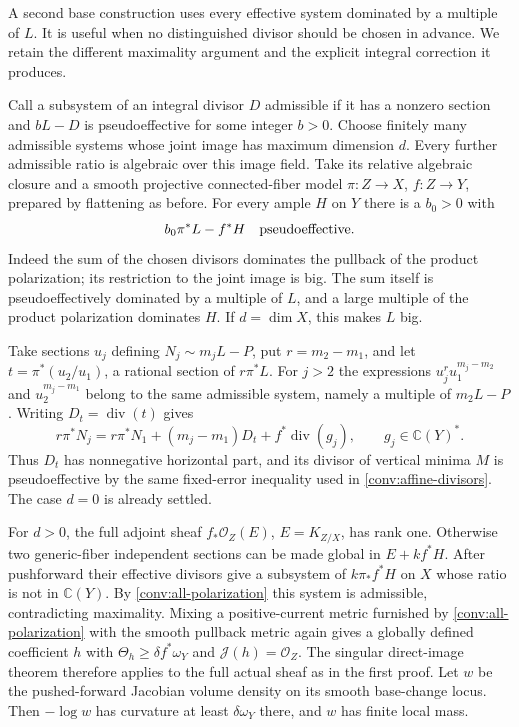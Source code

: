 A second base construction uses every effective system dominated by a
multiple of $L$.  It is useful when no distinguished divisor should be
chosen in advance.  We retain the different maximality argument and the
explicit integral correction it produces.

Call a subsystem of an integral divisor $D$ admissible if it has a
nonzero section and $bL-D$ is pseudoeffective for some integer $b>0$.
Choose finitely many admissible systems whose joint image has maximum
dimension $d$.  Every further admissible ratio is algebraic over this
image field.  Take its relative algebraic closure and a smooth
projective connected-fiber model $\pi:Z\to X$, $f:Z\to Y$, prepared
by flattening as before.  For every ample $H$ on $Y$ there is a $b_0>0$
with
\begin{equation}\label{conv:all-polarization}
 b_0\pi^*L-f^*H\quad\hbox{pseudoeffective}.
\end{equation}
Indeed the sum of the chosen divisors dominates the pullback of the
product polarization; its restriction to the joint image is big.
The sum itself is pseudoeffectively dominated by a multiple of $L$,
and a large multiple of the product polarization dominates $H$.
If $d=\dim X$, this makes $L$ big.

Take sections $u_j$ defining $N_j\sim m_jL-P$, put
$r=m_2-m_1$, and let $t=\pi^*(u_2/u_1)$, a rational section of
$r\pi^*L$.  For $j>2$ the expressions
$u_j^r u_1^{m_j-m_2}$ and $u_2^{m_j-m_1}$ belong to the same
admissible system, namely a multiple of $m_2L-P$.
Writing $D_t=\operatorname{div}(t)$ gives
\[
 r\pi^*N_j=r\pi^*N_1+(m_j-m_1)D_t+
                    f^*\operatorname{div}(g_j),
 \qquad g_j\in\mathbb C(Y)^*.
\]
Thus $D_t$ has nonnegative horizontal part, and its divisor of vertical
minima $M$ is pseudoeffective by the same fixed-error inequality used
in \eqref{conv:affine-divisors}.  The case $d=0$ is already settled.

For $d>0$, the full adjoint sheaf $f_*\mathcal O_Z(E)$,
$E=K_{Z/X}$, has rank one.  Otherwise two generic-fiber independent
sections can be made global in $E+kf^*H$.  After pushforward their
effective divisors give a subsystem of $k\pi_*f^*H$ on $X$ whose
ratio is not in $\mathbb C(Y)$.  By
\eqref{conv:all-polarization} this system is admissible, contradicting
maximality.  Mixing a positive-current metric furnished by
\eqref{conv:all-polarization} with the smooth pullback metric again
gives a globally defined coefficient $h$ with
$\Theta_h\ge\delta f^*\omega_Y$ and
$\mathcal J(h)=\mathcal O_Z$.  The singular direct-image theorem
therefore applies to the full actual sheaf as in the first proof.
Let $w$ be the pushed-forward Jacobian volume density on its smooth
base-change locus.  Then $-\log w$ has curvature at least
$\delta\omega_Y$ there, and $w$ has finite local mass.


